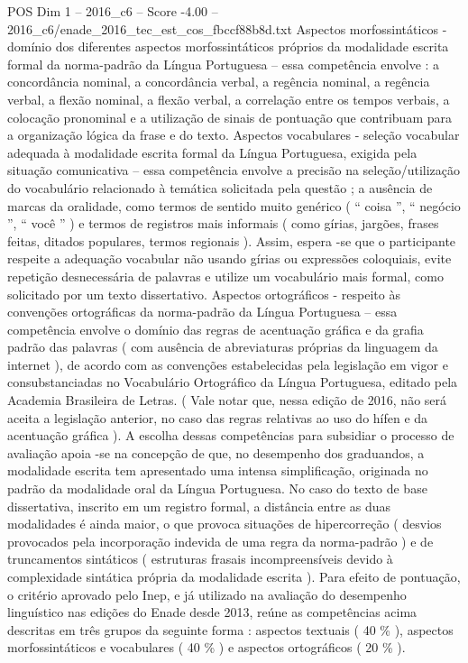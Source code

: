 \begin{textsample}{POS Dim 1 – 2016\_c6 – Score -4.00 – 2016\_c6/enade\_2016\_tec\_est\_cos\_fbccf88b8d.txt}
Aspectos morfossintáticos - domínio dos diferentes aspectos morfossintáticos próprios da modalidade escrita formal da norma-padrão da Língua Portuguesa – essa competência envolve : a concordância nominal, a concordância verbal, a regência nominal, a regência verbal, a flexão nominal, a flexão verbal, a correlação entre os tempos verbais, a colocação pronominal e a utilização de sinais de pontuação que contribuam para a organização lógica da frase e do texto.
Aspectos vocabulares - seleção vocabular adequada à modalidade escrita formal da Língua Portuguesa, exigida pela situação comunicativa – essa competência envolve a precisão na seleção/utilização do vocabulário relacionado à temática solicitada pela questão ; a ausência de marcas da oralidade, como termos de sentido muito genérico ( “ coisa ”, “ negócio ”, “ você ” ) e termos de registros mais informais ( como gírias, jargões, frases feitas, ditados populares, termos regionais ).
Assim, espera -se que o participante respeite a adequação vocabular não usando gírias ou expressões coloquiais, evite repetição desnecessária de palavras e utilize um vocabulário mais formal, como solicitado por um texto dissertativo.
Aspectos ortográficos - respeito às convenções ortográficas da norma-padrão da Língua Portuguesa – essa competência envolve o domínio das regras de acentuação gráfica e da grafia padrão das palavras ( com ausência de abreviaturas próprias da linguagem da internet ), de acordo com as convenções estabelecidas pela legislação em vigor e consubstanciadas no Vocabulário Ortográfico da Língua Portuguesa, editado pela Academia Brasileira de Letras. ( Vale notar que, nessa edição de 2016, não será aceita a legislação anterior, no caso das regras relativas ao uso do hífen e da acentuação gráfica ).
A escolha dessas competências para subsidiar o processo de avaliação apoia -se na concepção de que, no desempenho dos graduandos, a modalidade escrita tem apresentado uma intensa simplificação, originada no padrão da modalidade oral da Língua Portuguesa.
No caso do texto de base dissertativa, inscrito em um registro formal, a distância entre as duas modalidades é ainda maior, o que provoca situações de hipercorreção ( desvios provocados pela incorporação indevida de uma regra da norma-padrão ) e de truncamentos sintáticos ( estruturas frasais incompreensíveis devido à complexidade sintática própria da modalidade escrita ).
Para efeito de pontuação, o critério aprovado pelo Inep, e já utilizado na avaliação do desempenho linguístico nas edições do Enade desde 2013, reúne as competências acima descritas em três grupos da seguinte forma : aspectos textuais ( 40 \% ), aspectos morfossintáticos e vocabulares ( 40 \% ) e aspectos ortográficos ( 20 \% ).

\end{textsample}
